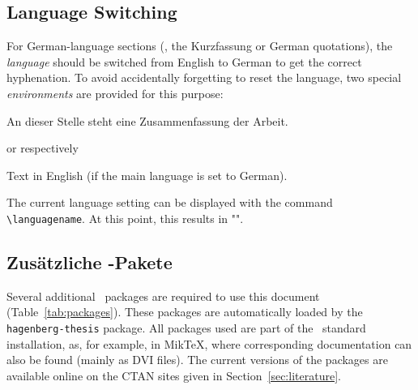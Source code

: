 \subsection{Language Switching}
\label{sec:language-switching}

For German-language sections (\eg, the Kurzfassung or German quotations), the
\emph{language} should be switched from English to German to get the correct
hyphenation. To avoid accidentally forgetting to reset the language, two special
\emph{environments} are provided for this purpose:
%
\begin{LaTeXCode}[numbers=none]
\begin{german}
    An dieser Stelle steht eine Zusammenfassung der Arbeit.
\end{german}
\end{LaTeXCode}
%
or respectively
%
\begin{LaTeXCode}[numbers=none]
\begin{english}
    Text in English (if the main language is set to German).
\end{english}
\end{LaTeXCode}
%
The current language setting can be displayed with the command
\verb!\languagename!. At this point, this results in
"\texttt{\languagename}".

\subsection{Zusätzliche {\latex}-Pakete}

Several additional \latex\ packages are required to use this document
(Table~\ref{tab:packages}). These packages are automatically loaded by the
\texttt{hagenberg-thesis} package. All packages used are part of the \latex\
standard installation, as, for example, in MikTeX, where corresponding
documentation can also be found (mainly as DVI files). The current versions of
the packages are available online on the CTAN sites given in
Section~\ref{sec:literature}.

